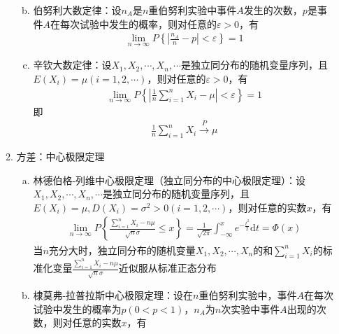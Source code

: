 \documentclass[12pt]{book}
\begin{document}
\begin{enumerate}[1.]
\begin{enumerate}[(1)]
\begin{enumerate}[a.]
{                              }
                        \item 伯努利大数定律：设$n_{A}$是$n$重伯努利实验中事件$A$发生的次数，$p$是事件$A$在每次试验中发生的概率，则对任意的$\varepsilon>0$，有
                              \begin{gather*}
                                  \lim\limits_{n\rightarrow\infty}{P\left\{\left|\frac{n_A}{n}-p\right|<\varepsilon\right\}}=1
                              \end{gather*}
                        \item 辛钦大数定律：设$X_1,X_2,\cdots,X_n,\cdots$是独立同分布的随机变量序列，且$E(X_i)=\mu (i=1,2,\cdots)$，则对任意的$\varepsilon>0$，有
                              \begin{gather*}
                                  \lim\limits_{n\rightarrow\infty}{P\left\{\left|\frac{1}{n}\sum_{i=1}^{n}X_i-\mu\right|<\varepsilon\right\}}=1
                              \end{gather*}
                              即
                              \begin{gather*}
                                  \frac{1}{n}\sum_{i=1}^{n}{X_i}\xrightarrow{P}\mu
                              \end{gather*}
                    \end{enumerate}
              \item 方差：中心极限定理
                    \begin{enumerate}[a.]
                        \item 林德伯格-列维中心极限定理（独立同分布的中心极限定理）：设$X_1,X_2,\cdots,X_n,\cdots$是独立同分布的随机变量序列，且$E(X_i)=\mu,D(X_i)=\sigma^{2}>0 (i=1,2,\cdots)$，则对任意的实数$x$，有
                              \begin{gather*}
                                  \lim\limits_{n\rightarrow\infty}{P\left\{\frac{\sum_{i=1}^{n}X_i-n\mu}{\sqrt n\sigma}\leqslant x\right\}}
                                  =\frac{1}{\sqrt{2\pi}}{ \int_{-\infty}^{x}{e^{-\frac{t^2}{2}} \mathrm{d}t} }
                                  =\Phi\left(x\right)
                              \end{gather*}
                              当$n$充分大时，独立同分布的随机变量$X_1,X_2,\cdots,X_n$的和$\sum_{i=1}^{n}{X_i}$的标准化变量$\frac{\sum_{i=1}^{n}{X_i}-n\mu}{\sqrt n\sigma}$近似服从标准正态分布
                        \item 棣莫弗-拉普拉斯中心极限定理：设在$n$重伯努利实验中，事件$A$在每次试验中发生的概率为$p(0<p<1)$，$n_A$为$n$次实验中事件$A$出现的次数，则对任意的实数$x$，有

\end{enumerate}
\end{enumerate}
\end{enumerate}
\end{document}
